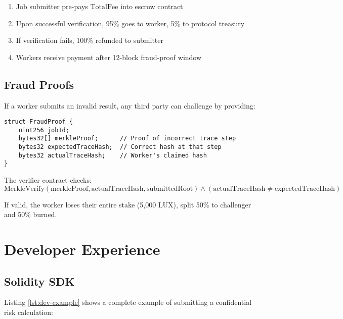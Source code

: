 \documentclass[11pt,letterpaper]{article}
\begin{document}
\begin{enumerate}
  \item Job submitter pre-pays $\text{TotalFee}$ into escrow contract
  \item Upon successful verification, 95\% goes to worker, 5\% to protocol treasury
  \item If verification fails, 100\% refunded to submitter
  \item Workers receive payment after 12-block fraud-proof window
\end{enumerate}

\subsection{Fraud Proofs}

If a worker submits an invalid result, any third party can challenge by providing:

\begin{lstlisting}[caption={Fraud Proof Structure}]
struct FraudProof {
    uint256 jobId;
    bytes32[] merkleProof;      // Proof of incorrect trace step
    bytes32 expectedTraceHash;  // Correct hash at that step
    bytes32 actualTraceHash;    // Worker's claimed hash
}
\end{lstlisting}

The verifier contract checks:
\begin{equation}
\text{MerkleVerify}(\text{merkleProof}, \text{actualTraceHash}, \text{submittedRoot}) \land (\text{actualTraceHash} \neq \text{expectedTraceHash})
\end{equation}

If valid, the worker loses their entire stake (5,000 LUX), split 50\% to challenger and 50\% burned.

\section{Developer Experience}
\label{sec:dev-experience}

\subsection{Solidity SDK}

Listing \ref{lst:dev-example} shows a complete example of submitting a confidential risk calculation:
\end{document}
